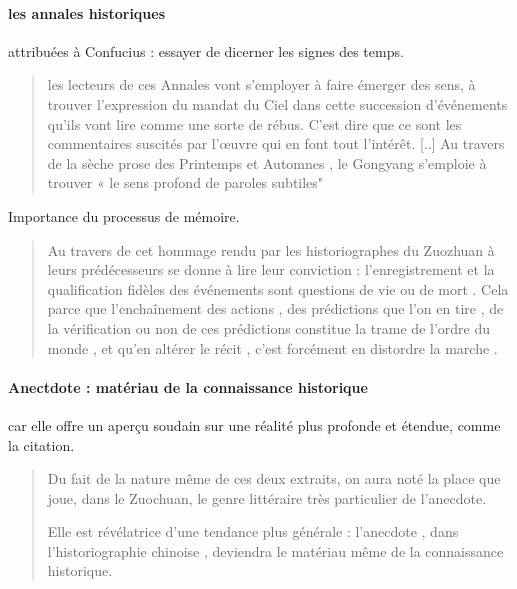 \paragraph{les annales historiques} attribuées à Confucius : essayer de dicerner les signes des temps. 
 \begin{quote}
les lecteurs de ces Annales vont s’employer à faire émerger des sens, à trouver l’expression du mandat du Ciel dans cette succession d’événements qu’ils vont lire comme une sorte de rébus. C’est dire que ce sont les commentaires suscités par l’œuvre qui en font tout l’intérêt.
[..]
Au travers de la sèche prose des Printemps et
  Automnes , le Gongyang s'emploie à trouver « le sens profond de paroles
subtiles"
\end{quote}


Importance du processus de mémoire.

  \begin{quote}

Au travers de cet hommage rendu par les historiographes du Zuozhuan à
leurs prédécesseurs se donne à lire leur conviction : l'enregistrement
et la qualification fidèles des événements sont questions de vie ou de
mort . Cela parce que l'enchaînement des actions , des prédictions que
l'on en tire , de la vérification ou non de ces prédictions constitue la
trame de l'ordre du monde , et qu'en altérer le récit , c'est forcément
en distordre la marche .

\end{quote}

\paragraph{Anectdote : matériau de la connaissance historique} car elle offre un aperçu soudain sur une réalité plus profonde et étendue, comme la citation.  \begin{quote}
Du fait de la nature même de ces deux extraits, on aura noté la place que joue, dans le Zuochuan, le genre littéraire très particulier de l’anecdote.
 
Elle est révélatrice d'une tendance plus générale : l'anecdote , dans
l'historiographie chinoise , deviendra le matériau même de la connaissance historique.
 

\end{quote} 
